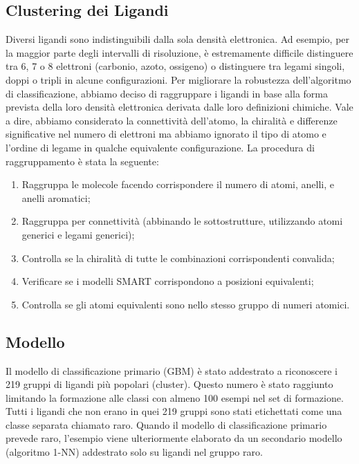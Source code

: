 \documentclass{article}
\begin{document}
\subsection{Clustering dei Ligandi}
Diversi ligandi sono indistinguibili dalla sola densità elettronica. Ad esempio, per la maggior parte degli intervalli di risoluzione, è estremamente difficile distinguere tra 6, 7 o 8 elettroni (carbonio, azoto, ossigeno) 
o distinguere tra legami singoli, doppi o tripli in alcune configurazioni. Per migliorare la robustezza dell'algoritmo di classificazione, abbiamo deciso di raggruppare i ligandi in base alla forma prevista della loro densità elettronica derivata 
dalle loro definizioni chimiche. Vale a dire, abbiamo considerato la connettività dell'atomo, la chiralità e differenze significative nel numero di elettroni ma abbiamo ignorato il tipo di atomo e l’ordine di legame in qualche equivalente configurazione. La procedura di raggruppamento è stata la seguente:
\begin{enumerate}
  \item Raggruppa le molecole facendo corrispondere il numero di atomi, anelli, e anelli aromatici;
  \item Raggruppa per connettività (abbinando le sottostrutture, utilizzando atomi generici e legami generici);
  \item Controlla se la chiralità di tutte le combinazioni corrispondenti convalida;
  \item Verificare se i modelli SMART corrispondono a posizioni equivalenti;
  \item Controlla se gli atomi equivalenti sono nello stesso gruppo di numeri atomici.
\end{enumerate}
\subsection{Modello}
Il modello di classificazione primario (GBM) è stato addestrato a riconoscere i 219 gruppi di ligandi più popolari (cluster). Questo numero è stato raggiunto limitando la formazione alle classi con almeno 100 esempi nel set di formazione. 
Tutti i ligandi che non erano in quei 219 gruppi sono stati etichettati come una classe separata chiamato raro. Quando il modello di classificazione primario prevede raro, l'esempio viene ulteriormente elaborato da un secondario modello (algoritmo 1-NN) addestrato solo su ligandi nel gruppo raro.
\end{document}
